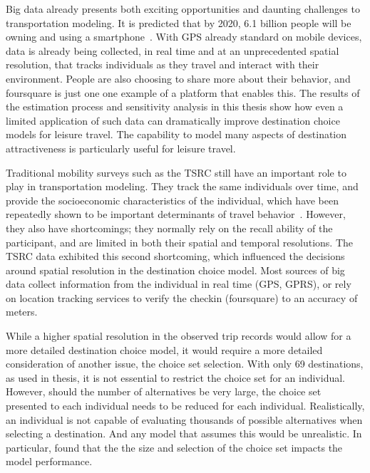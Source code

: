 Big data already presents both exciting opportunities and daunting challenges to transportation modeling. It is predicted that by 2020, 6.1 billion people will be owning and using a smartphone~\parencite{ericsson16}. With GPS already standard on mobile devices, data is already being collected, in real time and at an unprecedented spatial resolution, that tracks individuals as they travel and interact with their environment. People are also choosing to share more about their behavior, and foursquare is just one one example of a platform that enables this. The results of the estimation process and sensitivity analysis in this thesis show how even a limited application of such data can dramatically improve destination choice models for leisure travel. The capability to model many aspects of destination attractiveness is particularly useful for leisure travel.

Traditional mobility surveys such as the TSRC still have an important role to play in transportation modeling. They track the same individuals over time, and provide the socioeconomic characteristics of the individual, which have been repeatedly shown to be important determinants of travel behavior~\parencite{pas1984effect,hanson1982determinants}. However, they also have shortcomings; they normally rely on the recall ability of the participant, and are limited in both their spatial and temporal resolutions. The TSRC data exhibited this second shortcoming, which influenced the decisions around spatial resolution in the destination choice model. Most sources of big data collect information from the individual in real time (GPS, GPRS), or rely on location tracking services to verify the checkin (foursquare) to an accuracy of meters.

While a higher spatial resolution in the observed trip records would allow for a more detailed destination choice model, it would require a more detailed consideration of another issue, the choice set selection. With only 69 destinations, as used in thesis, it is not essential to restrict the choice set for an individual. However, should the number of alternatives be very large, the choice set presented to each individual needs to be reduced for each individual. Realistically, an individual is not capable of evaluating thousands of possible alternatives when selecting a destination. And any model that assumes this would be unrealistic. In particular, \textcite{AkivaLerman85} found that the the size and selection of the choice set impacts the model performance.

